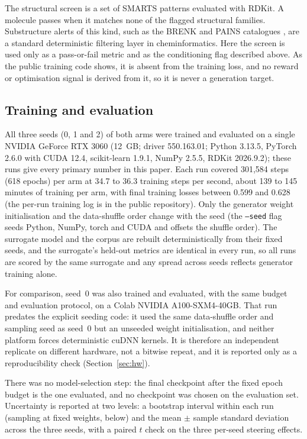\documentclass[11pt]{article}
\begin{document}
The structural screen is a set of SMARTS patterns evaluated with RDKit. A molecule passes
when it matches none of the flagged structural families. Substructure alerts of this kind,
such as the BRENK and PAINS catalogues \cite{brenk2008, baell2010pains}, are a standard
deterministic filtering layer in cheminformatics. Here the screen is used only as a
pass-or-fail metric and as the conditioning flag described above. As the public training
code shows, it is absent from the training loss, and no reward or optimisation signal is
derived from it, so it is never a generation target.

\subsection{Training and evaluation}

All three seeds (0, 1 and 2) of both arms were trained and evaluated on a single
NVIDIA GeForce RTX 3060 (12~GB; driver 550.163.01; Python 3.13.5, PyTorch 2.6.0 with CUDA
12.4, scikit-learn 1.9.1, NumPy 2.5.5, RDKit 2026.9.2); these runs give every primary number
in this paper. Each run covered 301{,}584 steps (618 epochs) per arm at 34.7 to 36.3
training steps per second, about 139 to 145 minutes of training per arm, with final
training losses between 0.599 and 0.628 (the per-run training log is in the public repository).
Only the generator weight initialisation and the data-shuffle order change with the seed
(the \texttt{--seed} flag seeds Python, NumPy, torch and CUDA and offsets the shuffle
order). The surrogate model and the corpus are rebuilt deterministically from their fixed
seeds, and the surrogate's held-out metrics are identical in every run, so all runs are
scored by the same surrogate and any spread across seeds reflects generator training alone.

For comparison, seed~0 was also trained and evaluated, with the same budget and
evaluation protocol, on a Colab NVIDIA A100-SXM4-40GB. That run predates the explicit seeding code:
it used the same data-shuffle order and sampling seed as seed~0 but an unseeded weight
initialisation, and neither platform forces deterministic cuDNN kernels. It is therefore an
independent replicate on different hardware, not a bitwise repeat, and it is reported only
as a reproducibility check (Section~\ref{sec:hw}).

There was no model-selection step: the final checkpoint after the fixed epoch budget is the
one evaluated, and no checkpoint was chosen on the evaluation set. Uncertainty is reported
at two levels: a bootstrap interval within each run (sampling at fixed weights, below) and
the mean $\pm$ sample standard deviation across the three seeds, with a paired $t$ check on
the three per-seed steering effects.
\end{document}
